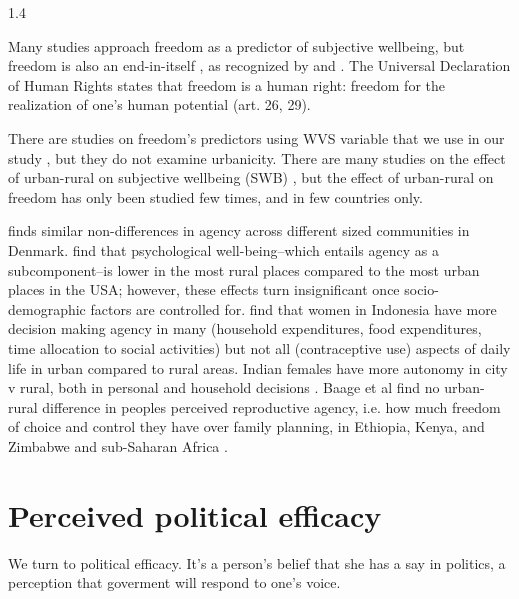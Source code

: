\documentclass[10pt, letterpaper]{article}
\begin{document}
\begin{spacing}{1.4}
  
Many studies approach freedom as a predictor of subjective wellbeing, but freedom
is also an end-in-itself \citep{aok_free_from_to}, as recognized by 
\citet{fromm13,fromm12,fromm92,fromm64,fromm44,fromm94} and \citet{sen00}.  The Universal
 Declaration of Human Rights states that freedom is a human right: 
 freedom for the realization of one's human potential (art. 26, 29). 

There are studies on freedom's predictors using WVS variable that we use in our study  
\citep[e.g.,][]{aok_free_from_to,pitlik2016free,nikolaev2016give}, but they do not examine
urbanicity. 
There are many studies on the effect of urban-rural on subjective wellbeing (SWB)
\citep[e.g.,][]{sorensen24,sorensen14,knies26,aok21}, but the effect of
urban-rural on freedom has only been studied few times, and in few countries only. 


\citet{lolle2023differences} finds similar non-differences in agency across
different sized communities in Denmark. 
\citet{atherton2024rural} find that psychological well-being--which entails
 agency as a subcomponent--is lower in the most rural places compared to the
most urban places in the USA; however, these effects turn insignificant once
socio-demographic factors are controlled for. 
\citet{kusnali2025rural}  find that women in Indonesia have more decision making
 agency in many (household expenditures, food expenditures, time allocation to
social activities) but not all (contraceptive use) aspects of daily life in
urban compared to rural areas.
Indian females have more autonomy in city v rural, both in personal and 
 household decisions \citep{mishra2014relative}. 
Baage et al find no urban-rural difference in peoples
perceived reproductive agency, i.e. how much freedom of choice and control they
have over family planning, in Ethiopia, Kenya, and Zimbabwe
\citep{baage2024attitudes}  and sub-Saharan Africa \citep{baage2026reproductive}.

 
\section{Perceived political efficacy}

We turn to political efficacy. %
It's a person's belief that she has a say in politics, a perception that
goverment will respond to one's voice. 
 

\end{spacing}
\end{document}
